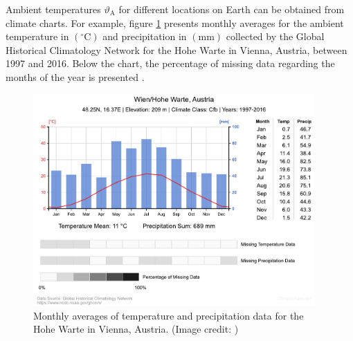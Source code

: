 Ambient temperatures $\vartheta_{\mathrm{A}}$ for different locations on Earth can be obtained from climate charts. For example, figure \ref{fig:temp_vienna} presents monthly averages for the ambient temperature in $\left( ^\circ \mathrm{C} \right)$ and precipitation in $\left( \mathrm{mm} \right)$ collected by the Global Historical Climatology Network for the Hohe Warte in Vienna, Austria, between 1997 and 2016. Below the chart, the percentage of missing data regarding the months of the year is presented \cite{Zepner:2020}.
\begin{figure}[h!]
	\centering
  	\includegraphics[width = 0.96\textwidth]{temp_maps/temp_vienna}
  	\caption{Monthly averages of temperature and precipitation data for the Hohe Warte in Vienna, Austria. (Image credit: \cite{Zepner:2020})}
	\label{fig:temp_vienna}
\end{figure}


